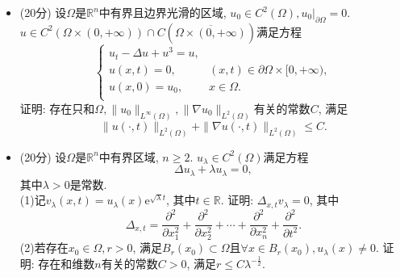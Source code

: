 \begin{itemize}
    \item[5.](20分)
    设$\Omega$是$\mathbb{R}^n$中有界且边界光滑的区域, $u_0\in C^2(\Omega),u_0|_{\partial\Omega}=0$. $u\in C^2(\Omega\times(0,+\infty))\cap C(\overline{\Omega\times (0,+\infty)})$满足方程
    $$\begin{cases}
        u_t-\Delta u+u^3=u,&\\
        u(x,t)=0,&(x,t)\in \partial\Omega\times [0,+\infty),\\
        u(x,0)=u_0,&x\in\Omega.\\
    \end{cases}$$
    证明: 存在只和$\Omega, \|u_0\|_{L^\infty(\Omega)}, \|\nabla u_0\|_{L^2(\Omega)}$有关的常数$C$, 满足
    $$\|u(\cdot,t)\|_{L^2(\Omega)}+\|\nabla u(\cdot,t)\|_{L^2(\Omega)}\le C.$$

    \item[6.](20分)
    设$\Omega$是$\mathbb{R}^n$中有界区域, $n\ge 2$. $u_\lambda\in C^2(\Omega)$满足方程
    $$\Delta u_\lambda+\lambda u_\lambda=0,$$
    其中$\lambda>0$是常数.\\
    (1)记$v_\lambda(x,t)=u_\lambda(x)\mathrm{e}^{\sqrt{\lambda}t}$, 其中$t\in\mathbb{R}$. 证明: $\Delta_{x,t}v_\lambda=0$, 其中
    $$\Delta_{x,t}=\frac{\partial^2}{\partial x_1^2}+\frac{\partial^2}{\partial x_2^2}+\cdots+\frac{\partial^2}{\partial x_n^2}+\frac{\partial^2}{\partial t^2}.$$
    (2)若存在$x_0\in\Omega, r>0$, 满足$B_r(x_0)\subset \Omega$且$\forall x\in B_r(x_0),u_\lambda(x)\neq0$. 证明: 存在和维数$n$有关的常数$C>0$, 满足$r\le C\lambda^{-\frac{1}{2}}$.
\end{itemize}

